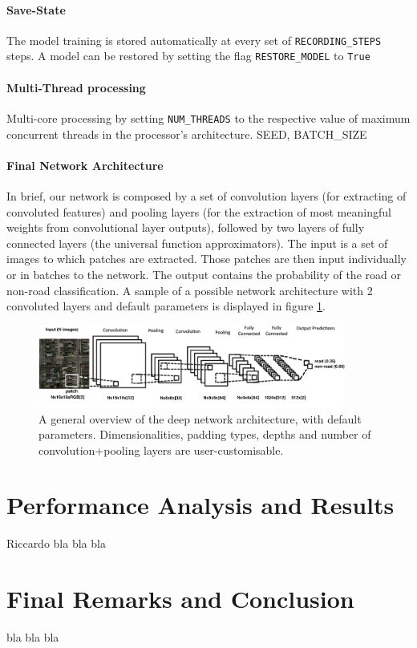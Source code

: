 \documentclass[fleqn,9 pt]{SelfArx} %
\begin{document}
\begin{sloppypar}
\paragraph{Save-State}

The model training is stored automatically at every set of \texttt{RECORDING\_STEPS} steps. A model can be restored by setting the flag \texttt{RESTORE\_MODEL} to \texttt{True}

\paragraph{Multi-Thread processing}

Multi-core processing by setting \texttt{NUM\_THREADS} to the respective value of maximum concurrent threads in the processor's architecture. SEED, BATCH\_SIZE %

\paragraph{Final Network Architecture}

In brief, our network is composed by a set of convolution layers (for extracting of convoluted features) and pooling layers (for the extraction of most meaningful weights from convolutional layer outputs), followed by two layers of fully connected layers (the universal function approximators). The input is a set of images to which patches are extracted. Those patches are then input individually or in batches to the network. The output contains the probability of the road or non-road classification. A sample of a possible network architecture with 2 convoluted layers and default parameters is displayed in figure \ref{fig-conv-2d-architecture}.

\begin{figure}
\centering
\includegraphics[width=0.9\textwidth]{figures/conv_2d_network.png}
\caption{\small A general overview of the deep network architecture, with default parameters. Dimensionalities, padding types, depths and number of convolution+pooling layers are user-customisable.}
\label{fig-conv-2d-architecture}
\end{figure}

\section{Performance Analysis and Results}

Riccardo bla bla bla

\section{Final Remarks and Conclusion}
\label{sec-Conclusion}

bla bla bla 





\end{sloppypar}
\end{document}
